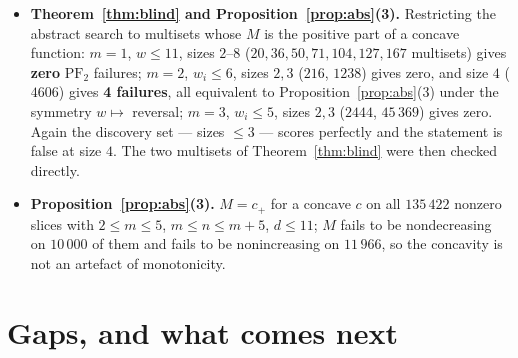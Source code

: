 \documentclass[11pt]{article}
\theoremstyle{definition}
\newcommand{\PFtwo}{\mathrm{PF}_2}
\begin{document}
\begin{itemize}
{at size 6}; at $m=2$ with $w_i\le5$, zero at sizes $2,3$ and $5$ failures at size $4$, $21$
at size $5$. \emph{The discovery set was sizes $\le3$, where the score was perfect.} The
$(\mathrm B)$ failures in the gap-free class are $23$ at $m=2$ and $198$ at $m=3$, with the
$\PFtwo$ conclusion failing on none of those.
\item \textbf{Theorem~\ref{thm:blind} and Proposition~\ref{prop:abs}(3).} Restricting the
abstract search to multisets whose $M$ is the positive part of a concave function: $m=1$,
$w\le11$, sizes $2$--$8$ ($20,36,50,71,104,127,167$ multisets) gives \textbf{zero} $\PFtwo$
failures; $m=2$, $w_i\le6$, sizes $2,3$ ($216$, $1238$) gives zero, and size $4$
($4606$) gives \textbf{4 failures}, all equivalent to
Proposition~\ref{prop:abs}(3) under the symmetry $w\mapsto$ reversal; $m=3$, $w_i\le5$,
sizes $2,3$ ($2444$, $45\,369$) gives zero. Again the discovery set --- sizes $\le3$ ---
scores perfectly and the statement is false at size $4$. The two multisets of
Theorem~\ref{thm:blind} were then checked directly.
\item \textbf{Proposition~\ref{prop:abs}(3).} $M=c_+$ for a concave $c$ on all $135\,422$
nonzero slices with $2\le m\le5$, $m\le n\le m+5$, $d\le11$; $M$ fails to be nondecreasing on $10\,000$ of them and fails to be
nonincreasing on $11\,966$, so the concavity is not an artefact of monotonicity.
\end{itemize}

\section{Gaps, and what comes next}
\end{document}
